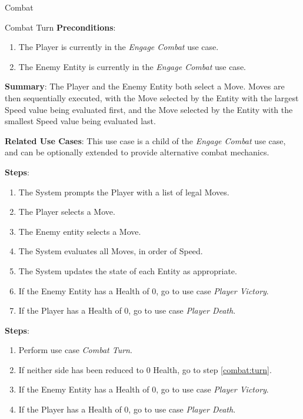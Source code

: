 \documentclass[12pt]{report}
\begin{document}
\begin{section}{Combat}
\begin{subsection}{Combat Turn}
      \textbf{Preconditions}:
      \begin{enumerate}
        \item The Player is currently in the \textit{Engage Combat} use case.
        \item The Enemy Entity is currently in the \textit{Engage Combat} use case.
      \end{enumerate}

      \textbf{Summary}:
      The Player and the Enemy Entity both select a Move. Moves are then
      sequentially executed, with the Move selected by the Entity with the
      largest Speed value being evaluated first, and the Move selected by the
      Entity with the smallest Speed value being evaluated last.

      \textbf{Related Use Cases}:
      This use case is a child of the \textit{Engage Combat} use case, and can be
      optionally extended to provide alternative combat mechanics.

      \textbf{Steps}:
      \begin{enumerate}
        \item The System prompts the Player with a list of legal Moves.
        \item The Player selects a Move.
        \item The Enemy entity selects a Move.
        \item The System evaluates all Moves, in order of Speed.
        \item The System updates the state of each Entity as appropriate.
        \item If the Enemy Entity has a Health of 0, go to use case \textit{Player
      	Victory}.
        \item If the Player has a Health of 0, go to use case \textit{Player
	      Death}.
      \end{enumerate}
    \end{subsection} 

      \textbf{Steps}:
      \begin{enumerate}

        \item \label{combat:turn} Perform use case \textit{Combat Turn}.
        \item If neither side has been reduced to 0 Health,
	       go to step \ref{combat:turn}.
        \item If the Enemy Entity has a Health of 0, go to use case \textit{Player
        Victory}.
        \item If the Player has a Health of 0, go to use case \textit{Player
	      Death}.
      \end{enumerate}



\end{section}
\end{document}
